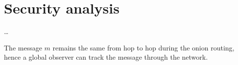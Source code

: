 \section{Security analysis}%
\label{SecurityAnalysis}

\dots

The message \(m\) remains the same from hop to hop during the onion routing, 
hence a global observer can track the message through the network.
